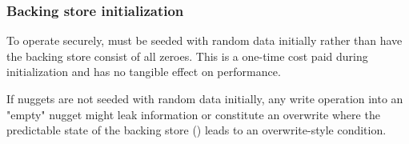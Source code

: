 \subsubsection{Backing store initialization}

To operate securely, \SYSTEM{} must be seeded with random data initially rather
than have the backing store consist of all zeroes. This is a one-time cost paid
during initialization and has no tangible effect on performance.

If nuggets are not seeded with random data initially, any write operation into
an "empty" nugget might leak information or constitute an overwrite where the
predictable state of the backing store () leads to
an overwrite-style condition.

